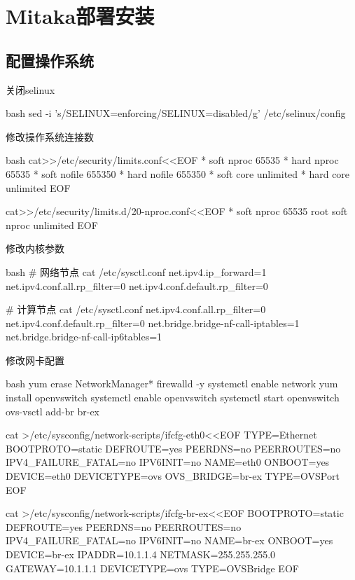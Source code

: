 \chapter{Mitaka部署安装}

\section{配置操作系统}
\begin{outline}[enumerate]

\1 关闭selinux
\begin{code-in-enumerate}{bash}
sed -i 's/SELINUX=enforcing/SELINUX=disabled/g' /etc/selinux/config
\end{code-in-enumerate}

\1 修改操作系统连接数
\begin{code-in-enumerate}{bash}
cat>>/etc/security/limits.conf<<EOF
*               soft    nproc           65535
*               hard    nproc           65535
*               soft    nofile          655350
*               hard    nofile          655350
*               soft    core            unlimited
*               hard    core            unlimited
EOF

cat>>/etc/security/limits.d/20-nproc.conf<<EOF
*          soft    nproc     65535
root       soft    nproc     unlimited
EOF
\end{code-in-enumerate}

\1 修改内核参数
\begin{code-in-enumerate}{bash}
# 网络节点
cat /etc/sysctl.conf
net.ipv4.ip_forward=1
net.ipv4.conf.all.rp_filter=0
net.ipv4.conf.default.rp_filter=0

# 计算节点
cat /etc/sysctl.conf
net.ipv4.conf.all.rp_filter=0
net.ipv4.conf.default.rp_filter=0
net.bridge.bridge-nf-call-iptables=1
net.bridge.bridge-nf-call-ip6tables=1
\end{code-in-enumerate}

\1 修改网卡配置
\begin{code-in-enumerate}{bash}
yum erase NetworkManager* firewalld -y
systemctl enable network
yum install openvswitch
systemctl enable openvswitch
systemctl start openvswitch
ovs-vsctl add-br br-ex

cat >/etc/sysconfig/network-scripts/ifcfg-eth0<<EOF
TYPE=Ethernet
BOOTPROTO=static
DEFROUTE=yes
PEERDNS=no
PEERROUTES=no
IPV4_FAILURE_FATAL=no
IPV6INIT=no
NAME=eth0
ONBOOT=yes
DEVICE=eth0
DEVICETYPE=ovs
OVS_BRIDGE=br-ex
TYPE=OVSPort
EOF

cat >/etc/sysconfig/network-scripts/ifcfg-br-ex<<EOF
BOOTPROTO=static
DEFROUTE=yes
PEERDNS=no
PEERROUTES=no
IPV4_FAILURE_FATAL=no
IPV6INIT=no
NAME=br-ex
ONBOOT=yes
DEVICE=br-ex
IPADDR=10.1.1.4
NETMASK=255.255.255.0
GATEWAY=10.1.1.1
DEVICETYPE=ovs
TYPE=OVSBridge
EOF


\end{code-in-enumerate}
\end{outline}
